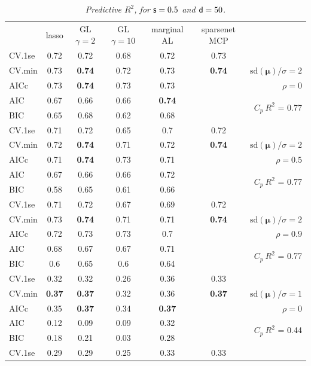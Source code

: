 \documentclass[12pt]{article}
\newcommand{\mr}[1]{\mathrm{#1}}
\newcommand{\bm}[1]{\mathbf{#1}}
\begin{document}
\begin{table}[p]\vspace{-.5cm}
\caption[l]{\it Predictive $R^2$, for ${\sf s}=0.5$ and  ${\sf d}=50$.}
\vspace{-.5cm}
\small{}
\begin{center}
\begin{tabular}{l*{5}{c}|r}
 & lasso & GL $\gamma=2$ & GL $\gamma=10$ & marginal AL & sparsenet MCP  &  \\
\cline{1-7}
CV.1se & 0.72 & 0.72 & 0.68 & 0.72 & 0.73 &\\
CV.min & 0.73 & {\bf 0.74} & 0.72 & 0.73 & {\bf 0.74} &  $\mr{sd}(\bm{\mu})/\sigma=2$ \\
AICc & 0.73 & {\bf 0.74} & 0.73 & 0.73 & & $\rho=0$ \\
AIC & 0.67 & 0.66 & 0.66 & {\bf 0.74} & & \multirow{2}{*}{$C_p ~ R^2$ = 0.77} \\
BIC & 0.65 & 0.68 & 0.62 & 0.68 & & \\
 \hline 
CV.1se & 0.71 & 0.72 & 0.65 & 0.7 & 0.72 &\\
CV.min & 0.72 & {\bf 0.74} & 0.71 & 0.72 & {\bf 0.74} &  $\mr{sd}(\bm{\mu})/\sigma=2$ \\
AICc & 0.71 & {\bf 0.74} & 0.73 & 0.71 & & $\rho=0.5$ \\
AIC & 0.67 & 0.66 & 0.66 & 0.72 & & \multirow{2}{*}{$C_p ~ R^2$ = 0.77} \\
BIC & 0.58 & 0.65 & 0.61 & 0.66 & & \\
 \hline 
CV.1se & 0.71 & 0.72 & 0.67 & 0.69 & 0.72 &\\
CV.min & 0.73 & {\bf 0.74} & 0.71 & 0.71 & {\bf 0.74} &  $\mr{sd}(\bm{\mu})/\sigma=2$ \\
AICc & 0.72 & 0.73 & 0.73 & 0.7 & & $\rho=0.9$ \\
AIC & 0.68 & 0.67 & 0.67 & 0.71 & & \multirow{2}{*}{$C_p ~ R^2$ = 0.77} \\
BIC & 0.6 & 0.65 & 0.6 & 0.64 & & \\
 \hline 
CV.1se & 0.32 & 0.32 & 0.26 & 0.36 & 0.33 &\\
CV.min & {\bf 0.37} & {\bf 0.37} & 0.32 & 0.36 & {\bf 0.37} &  $\mr{sd}(\bm{\mu})/\sigma=1$ \\
AICc & 0.35 & {\bf 0.37} & 0.34 & {\bf 0.37} & & $\rho=0$ \\
AIC & 0.12 & 0.09 & 0.09 & 0.32 & & \multirow{2}{*}{$C_p ~ R^2$ = 0.44} \\
BIC & 0.18 & 0.21 & 0.03 & 0.28 & & \\
 \hline 
CV.1se & 0.29 & 0.29 & 0.25 & 0.33 & 0.33 &\\

\end{tabular}
\end{center}
\end{table}
\end{document}
